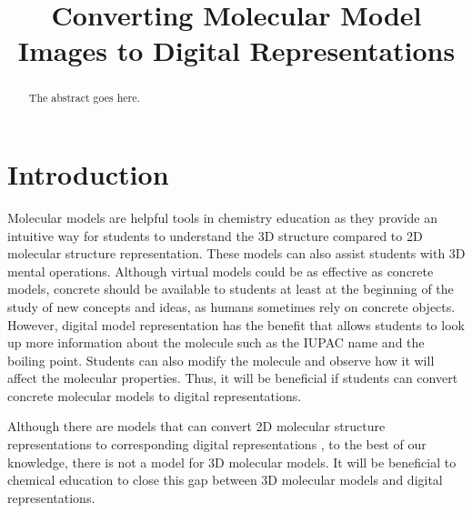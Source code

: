 \documentclass[conference]{IEEEtran}
\begin{document}
\title{Converting Molecular Model Images to Digital Representations}


\author{
\and
{}
}

\maketitle


\begin{abstract}
The abstract goes here.
\end{abstract}


\section{Introduction}
Molecular models are helpful tools in chemistry education as they provide an intuitive way for students to understand the 3D structure compared to 2D molecular structure representation. These models can also assist students with 3D mental operations. Although virtual models could be as effective as concrete models, concrete should be available to students at least at the beginning of the study of new concepts and ideas, as humans sometimes rely on concrete objects.\cite{savec_evaluating_2005} However, digital model representation has the benefit that allows students to look up more information about the molecule such as the IUPAC name and the boiling point. Students can also modify the molecule and observe how it will affect the molecular properties. Thus, it will be beneficial if students can convert concrete molecular models to digital representations. 

Although there are models that can convert 2D molecular structure representations to corresponding digital representations \cite{swinocsr}\cite{decimer}\cite{chempix}, to the best of our knowledge, there is not a model for 3D molecular models. It will be beneficial to chemical education to close this gap between 3D molecular models and digital representations. 
\end{document}
